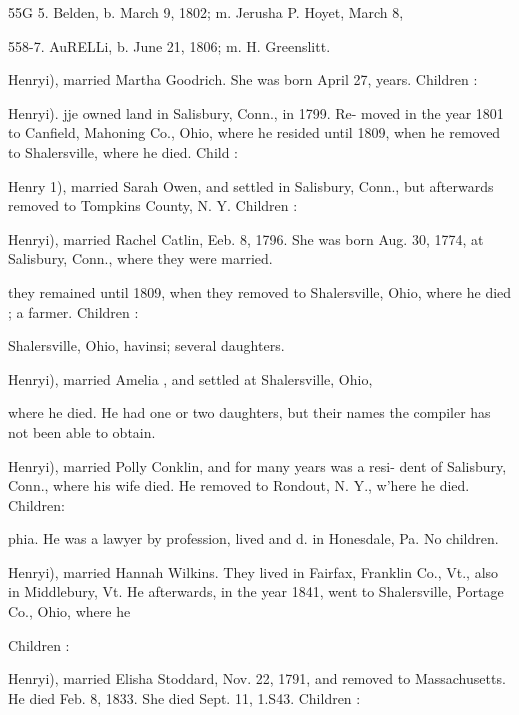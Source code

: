 \documentclass{book}
\begin{document}
55G 5. Belden, b. March 9, 1802; m. Jerusha P. Hoyet, March 8, 


558-7. AuRELLi, b. June 21, 1806; m. H. Greenslitt. 


Henryi), married Martha Goodrich. She was born April 27, 
years. Children : 










Henryi). jje owned land in Salisbury, Conn., in 1799. Re- 
moved in the year 1801 to Canfield, Mahoning Co., Ohio, where 
he resided until 1809, when he removed to Shalersville, where he 
died. Child : 


Henry 1), married Sarah Owen, and settled in Salisbury, Conn., 
but afterwards removed to Tompkins County, N. Y. Children : 


Henryi), married Rachel Catlin, Eeb. 8, 1796. She was born 
Aug. 30, 1774, at Salisbury, Conn., where they were married. 




they remained until 1809, when they removed to Shalersville, 
Ohio, where he died ; a farmer. Children : 


Shalersville, Ohio, havinsi; several daughters. 





Henryi), married Amelia , and settled at Shalersville, Ohio, 

where he died. He had one or two daughters, but their names 
the compiler has not been able to obtain. 


Henryi), married Polly Conklin, and for many years was a resi- 
dent of Salisbury, Conn., where his wife died. He removed to 
Rondout, N. Y., w'here he died. Children: 






phia. He was a lawyer by profession, lived and d. in 
Honesdale, Pa. No children. 

Henryi), married Hannah Wilkins. They lived in Fairfax, 
Franklin Co., Vt., also in Middlebury, Vt. He afterwards, in 
the year 1841, went to Shalersville, Portage Co., Ohio, where he 

Children : 








Henryi), married Elisha Stoddard, Nov. 22, 1791, and removed 
to Massachusetts. He died Feb. 8, 1833. She died Sept. 11, 
1.S43. Children : 
\end{document}
